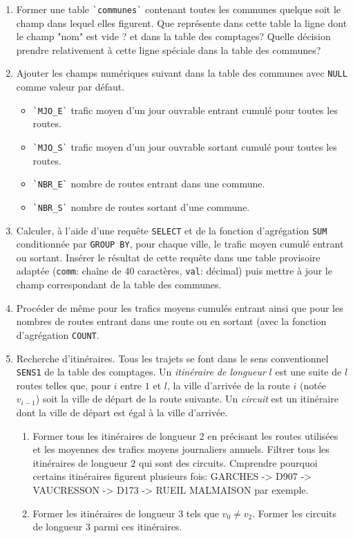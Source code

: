\begin{enumerate}
  \item Former une table \verb|`communes`| contenant toutes les communes quelque soit le champ dans lequel elles figurent. Que représente dans cette table la ligne dont le champ "nom" est vide ? et dans la table des comptages? Quelle décision prendre relativement à cette ligne spéciale dans la table des communes?
  \item Ajouter les champs numériques suivant dans la table des communes avec \verb|NULL| comme valeur par défaut. 
\begin{itemize}
  \item \verb|`MJO_E`| trafic moyen d'un jour ouvrable entrant cumulé pour toutes les routes.
  \item \verb|`MJO_S`| trafic moyen d'un jour ouvrable sortant cumulé pour toutes les routes.
  \item \verb|`NBR_E`| nombre de routes entrant dans une commune.
  \item \verb|`NBR_S`| nombre de routes sortant d'une commune.
\end{itemize}

  \item Calculer, à l'aide d'une requête \verb|SELECT| et de la fonction d'agrégation \verb|SUM| conditionnée par \verb|GROUP BY|, pour chaque ville, le trafic moyen cumulé entrant ou sortant. Insérer le résultat de cette requête dans une table provisoire adaptée (\verb|comm|: chaîne de 40 caractères, \verb|val|: décimal) puis mettre à jour le champ correspondant de la table des communes.

  \item Procéder de même pour les trafics moyens cumulés entrant ainsi que pour les nombres de routes entrant dans une route ou en sortant (avec la fonction d'agrégation \verb|COUNT|. 
  
  \item Recherche d'itinéraires. Tous les trajets se font dans le sens conventionnel \verb|SENS1| de la table des comptages. Un \emph{itinéraire de longueur} $l$ est une suite de $l$ routes telles que, pour $i$ entre $1$ et $l$, la ville d'arrivée de la route $i$ (notée $v_{i-1}$) soit la ville de départ de la route suivante. Un \emph{circuit} est un itinéraire dont la ville de départ est égal à la ville d'arrivée.
  \begin{enumerate}
    \item Former tous les itinéraires de longueur $2$ en précisant les routes utilisées et les moyennes des trafics moyens journaliers annuels. Filtrer tous les itinéraires de longueur $2$ qui sont des circuits. Cmprendre pourquoi certains itinéraires figurent plusieurs fois: GARCHES -> D907 -> VAUCRESSON -> D173 -> RUEIL MALMAISON par exemple.
    \item Former les itinéraires de longueur $3$ tels que $v_0 \neq v_2$. Former les circuits de longueur $3$ parmi ces itinéraires.
  \end{enumerate}
  
\end{enumerate}



